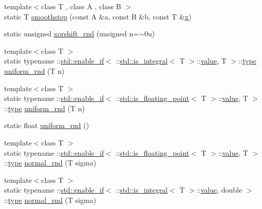 \begin{DoxyCompactItemize}
\item 
{\footnotesize template$<$class T , class A , class B $>$ }\\static T \hyperlink{namespacetrimesh_abf9461d50c23930206bc063132b88552}{smoothstep} (const A \&a, const B \&b, const T \&\hyperlink{namespacetrimesh_a3365d1b1a1bc5d8e9c844cf589a8c4a8}{x})
\item 
static unsigned \hyperlink{namespacetrimesh_ae031f5f6744297540cc92742bb2ffead}{xorshift\+\_\+rnd} (unsigned n=$\sim$0u)
\item 
{\footnotesize template$<$class T $>$ }\\static typename \+::\hyperlink{structstd_1_1enable__if}{std\+::enable\+\_\+if}$<$ \+::\hyperlink{structstd_1_1is__integral}{std\+::is\+\_\+integral}$<$ T $>$\+::\hyperlink{namespacetrimesh_ab10cc1052c9d1d1376d92211b6ca27dd}{value}, T $>$\+::\hyperlink{namespacetrimesh_aa726c5bf9cff74a26269e8d258ae9e3d}{type} \hyperlink{namespacetrimesh_a2c25f135957e8b30006d06ff4b84df08}{uniform\+\_\+rnd} (T n)
\item 
{\footnotesize template$<$class T $>$ }\\static typename \+::\hyperlink{structstd_1_1enable__if}{std\+::enable\+\_\+if}$<$ \+::\hyperlink{structstd_1_1is__floating__point}{std\+::is\+\_\+floating\+\_\+point}$<$ T $>$\+::\hyperlink{namespacetrimesh_ab10cc1052c9d1d1376d92211b6ca27dd}{value}, T $>$\+::\hyperlink{namespacetrimesh_aa726c5bf9cff74a26269e8d258ae9e3d}{type} \hyperlink{namespacetrimesh_a945b2b78e3a86753130c62d266e85492}{uniform\+\_\+rnd} (T n)
\item 
static float \hyperlink{namespacetrimesh_a4f0571559648c5888eb24b0697808d0b}{uniform\+\_\+rnd} ()
\item 
{\footnotesize template$<$class T $>$ }\\static typename \+::\hyperlink{structstd_1_1enable__if}{std\+::enable\+\_\+if}$<$ \+::\hyperlink{structstd_1_1is__floating__point}{std\+::is\+\_\+floating\+\_\+point}$<$ T $>$\+::\hyperlink{namespacetrimesh_ab10cc1052c9d1d1376d92211b6ca27dd}{value}, T $>$\+::\hyperlink{namespacetrimesh_aa726c5bf9cff74a26269e8d258ae9e3d}{type} \hyperlink{namespacetrimesh_a6d0babd7680a6eb905c92af4d2ae558d}{normal\+\_\+rnd} (T sigma)
\item 
{\footnotesize template$<$class T $>$ }\\static typename \+::\hyperlink{structstd_1_1enable__if}{std\+::enable\+\_\+if}$<$ \+::\hyperlink{structstd_1_1is__integral}{std\+::is\+\_\+integral}$<$ T $>$\+::\hyperlink{namespacetrimesh_ab10cc1052c9d1d1376d92211b6ca27dd}{value}, double $>$\+::\hyperlink{namespacetrimesh_aa726c5bf9cff74a26269e8d258ae9e3d}{type} \hyperlink{namespacetrimesh_acd2b8cf62ea31db90638e69e189a14ac}{normal\+\_\+rnd} (T sigma)

\end{DoxyCompactItemize}
